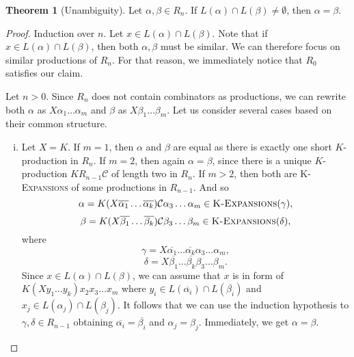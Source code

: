 \documentclass[11pt,a4paper]{amsart}
\theoremstyle{definition}
\newtheorem{theorem}{Theorem}
\newcommand{\KExpansions}[1]{\textsc{K-Expansions}(#1)}
\begin{document}
\begin{theorem}[Unambiguity]\label{th-unambiguity}
    Let $\alpha, \beta \in R_n$. If $L(\alpha) \cap L(\beta) \neq \emptyset$,
    then $\alpha = \beta$.
\end{theorem}

\begin{proof}
    Induction over $n$. Let $x \in L(\alpha) \cap L(\beta)$. Note that if $x \in L(\alpha) \cap L(\beta)$, then both $\alpha, \beta$ must be similar. We can therefore focus on similar productions of $R_n$. For that reason, we
    immediately notice that $R_0$ satisfies our claim.
    
     Let $n > 0$. Since $R_n$
    does not contain combinators as productions, we can rewrite both
    $\alpha$ as $X \alpha_1 \ldots \alpha_m$ and $\beta$ as $X
    \beta_1 \ldots \beta_m$. Let us consider several cases based on their common
    structure.
    \begin{enumerate}[(i)]
        \item Let $X = K$. If $m = 1$, then $\alpha$ and $\beta$ are
            equal as there is exactly one short $K$-production in $R_n$. If
            $m=2$, then again $\alpha = \beta$, since there is a unique
            $K$-production $K R_{n-1} \mathcal{C}$ of length two in $R_n$. If $m >
            2$, then both are \textsc{K-Expansions} of some productions in
            $R_{n-1}$. And so
            \[ \alpha = K (X \overline{\alpha_1} \ldots \overline{\alpha_k}) \mathcal{C}
            \alpha_3 \ldots \alpha_m \in \KExpansions{\gamma}, \]
            \[ \beta = K (X \overline{\beta_1} \ldots \overline{\beta_k}) \mathcal{C}
            \beta_3 \ldots \beta_m \in \KExpansions{\delta}, \]
            where
            \[\gamma = X \overline{\alpha_1}
            \ldots \overline{\alpha_k} \alpha_3 \ldots \alpha_m,\]
            \[\delta = X \overline{\beta_1}
            \ldots \overline{\beta_k} \beta_3 \ldots \beta_m.\]
            Since $x \in L(\alpha) \cap L(\beta)$, we can assume that $x$ is in
            form of $K (X y_1 \ldots y_k) x_2 x_3 \ldots x_m$ where $y_i \in
            L(\overline{\alpha_i}) \cap L(\overline{\beta_i})$ and $x_j \in L(\alpha_j)
            \cap L(\beta_j)$. It follows that we can use the induction
            hypothesis to $\gamma, \delta \in R_{n-1}$ obtaining
            $\overline{\alpha_i} = \overline{\beta_i}$ and $\alpha_j = \beta_j$.
            Immediately, we get $\alpha = \beta$.
        

\end{enumerate}
\end{proof}
\end{document}
